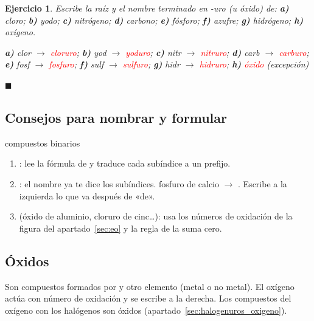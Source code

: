 \documentclass[12pt]{article}
\theoremstyle{mygreennumbox}
\newtheorem{ejercicioT}{Ejercicio}[section]
\newenvironment{exercise}{\begin{eBoxmygreen}\begin{ejercicioT}}{\hfill{\color{mygreen}\tiny\ensuremath{\blacksquare}}\end{ejercicioT}\end{eBoxmygreen}}
\begin{document}
\begin{exercise}
    Escribe la raíz y el nombre terminado en -uro (u óxido) de: \textbf{a)} cloro; \textbf{b)} yodo; \textbf{c)} nitrógeno; \textbf{d)} carbono; \textbf{e)} fósforo; \textbf{f)} azufre; \textbf{g)} hidrógeno; \textbf{h)} oxígeno.
    \begin{solu}
        \textbf{a)} clor \(\to\) \textcolor{red}{cloruro}; \textbf{b)} yod \(\to\) \textcolor{red}{yoduro}; \textbf{c)} nitr \(\to\) \textcolor{red}{nitruro}; \textbf{d)} carb \(\to\) \textcolor{red}{carburo}; \textbf{e)} fosf \(\to\) \textcolor{red}{fosfuro}; \textbf{f)} sulf \(\to\) \textcolor{red}{sulfuro}; \textbf{g)} hidr \(\to\) \textcolor{red}{hidruro}; \textbf{h)} \textcolor{red}{óxido} (excepción)
    \end{solu}
\end{exercise}

\subsection{Consejos para nombrar y formular}

\begin{consejos}{compuestos binarios}
    \begin{enumerate}[label=\numberballgreen]
        \item {}: lee la fórmula de  y traduce cada subíndice a un prefijo.
        \item {}: el nombre ya te dice los subíndices. fosfuro de calcio \(\to\) . Escribe a la izquierda lo que va después de «de».
        \item {} (óxido de aluminio, cloruro de cinc\dots): usa los números de oxidación de la figura del apartado~\ref{sec:eo} y la regla de la suma cero.
    \end{enumerate}
\end{consejos}

\subsection{Óxidos}\label{sec:oxidos}

Son compuestos formados por  y otro elemento (metal o no metal). El oxígeno actúa con número de oxidación  y se escribe a la derecha. Los compuestos del oxígeno con los halógenos  son óxidos (apartado~\ref{sec:halogenuros_oxigeno}).
\end{document}
